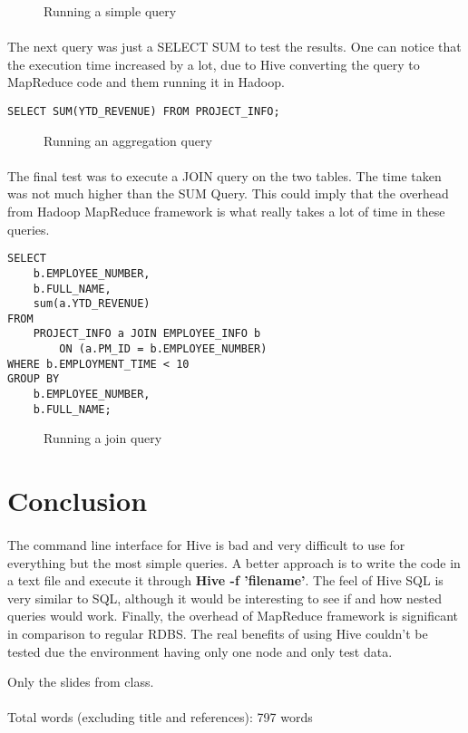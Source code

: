 \begin{figure}[H]
	\centering
	\caption{Running a simple query}
\end{figure}

\paragraph{}The next query was just a SELECT SUM to test the results. One can notice that the execution time increased by a lot, due to Hive converting the query to MapReduce code and them running it in Hadoop. 
\begin{lstlisting}
SELECT SUM(YTD_REVENUE) FROM PROJECT_INFO;
\end{lstlisting}

\begin{figure}[H]
	\centering
	\caption{Running an aggregation query}
\end{figure}

\paragraph{}The final test was to execute a JOIN query on the two tables. The time taken was not much higher than the SUM Query. This could imply that the overhead from Hadoop MapReduce framework is what really takes a lot of time in these queries.
\begin{lstlisting}
SELECT
	b.EMPLOYEE_NUMBER,
	b.FULL_NAME,
	sum(a.YTD_REVENUE)
FROM
	PROJECT_INFO a JOIN EMPLOYEE_INFO b
		ON (a.PM_ID = b.EMPLOYEE_NUMBER)
WHERE b.EMPLOYMENT_TIME < 10
GROUP BY
	b.EMPLOYEE_NUMBER,
	b.FULL_NAME;
\end{lstlisting}

\begin{figure}[H]
	\centering
	\caption{Running a join query}
\end{figure}

\section{Conclusion}
\paragraph{}The command line interface for Hive is bad and very difficult to use for everything but the most simple queries. A better approach is to write the code in a text file and execute it through \textbf{Hive -f 'filename'}. The feel of Hive SQL is very similar to SQL, although it would be interesting to see if and how nested queries would work. Finally, the overhead of MapReduce framework is significant in comparison to regular RDBS. The real benefits of using Hive couldn't be tested due the environment having only one node and only test data.

\begin{thebibliography}{1}
Only the slides from class.
\end{thebibliography}

\paragraph{} Total words (excluding title and references): 797 words

